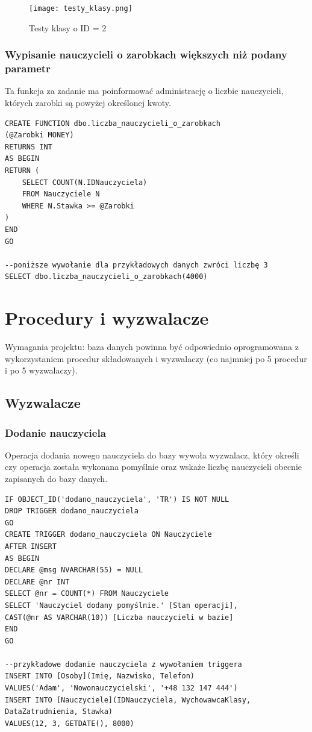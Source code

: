 \documentclass[60pt]{article}
\begin{document}
\begin{figure}[h]
  \texttt{[image: testy\_klasy.png]}
  \caption{Testy klasy o ID = 2}
  \label{Testy klasy o ID = 2}
\end{figure}

\subsubsection{Wypisanie nauczycieli o zarobkach większych niż podany parametr}

Ta funkcja za zadanie ma poinformować administrację o liczbie nauczycieli, których zarobki są powyżej określonej kwoty. 

\begin{verbatim}
CREATE FUNCTION dbo.liczba_nauczycieli_o_zarobkach
(@Zarobki MONEY)
RETURNS INT
AS BEGIN
RETURN (
    SELECT COUNT(N.IDNauczyciela)
    FROM Nauczyciele N
    WHERE N.Stawka >= @Zarobki
)
END
GO

--poniższe wywołanie dla przykładowych danych zwróci liczbę 3
SELECT dbo.liczba_nauczycieli_o_zarobkach(4000)
\end{verbatim}

\newpage

\section{Procedury i wyzwalacze}

Wymagania projektu: baza danych powinna być odpowiednio oprogramowana z wykorzystaniem procedur składowanych i wyzwalaczy (co najmniej po 5 procedur i po 5 wyzwalaczy).

\subsection{Wyzwalacze}

\subsubsection{Dodanie nauczyciela}

Operacja dodania nowego nauczyciela do bazy wywoła wyzwalacz, który określi czy operacja została wykonana pomyślnie oraz wskaże liczbę nauczycieli obecnie zapisanych do bazy danych.

\begin{verbatim}
IF OBJECT_ID('dodano_nauczyciela', 'TR') IS NOT NULL
DROP TRIGGER dodano_nauczyciela
GO
CREATE TRIGGER dodano_nauczyciela ON Nauczyciele
AFTER INSERT
AS BEGIN
DECLARE @msg NVARCHAR(55) = NULL
DECLARE @nr INT
SELECT @nr = COUNT(*) FROM Nauczyciele
SELECT 'Nauczyciel dodany pomyślnie.' [Stan operacji], 
CAST(@nr AS VARCHAR(10)) [Liczba nauczycieli w bazie]
END
GO

--przykładowe dodanie nauczyciela z wywołaniem triggera
INSERT INTO [Osoby](Imię, Nazwisko, Telefon) 
VALUES('Adam', 'Nowonauczycielski', '+48 132 147 444')
INSERT INTO [Nauczyciele](IDNauczyciela, WychowawcaKlasy, DataZatrudnienia, Stawka)
VALUES(12, 3, GETDATE(), 8000)
\end{verbatim}
\end{document}
